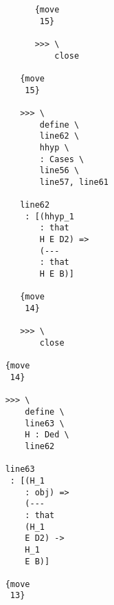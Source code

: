 \documentclass[12pt]{article}
\begin{document}
\begin{verbatim}
                                                {move 
                                                 15}

                                                >>> \
                                                    close

                                             {move 
                                              15}

                                             >>> \
                                                 define \
                                                 line62 \
                                                 hhyp \
                                                 : Cases \
                                                 line56 \
                                                 line57, line61

                                             line62 
                                              : [(hhyp_1 
                                                 : that 
                                                 H E D2) => 
                                                 (--- 
                                                 : that 
                                                 H E B)]

                                             {move 
                                              14}

                                             >>> \
                                                 close

                                          {move 
                                           14}

                                          >>> \
                                              define \
                                              line63 \
                                              H : Ded \
                                              line62

                                          line63 
                                           : [(H_1 
                                              : obj) => 
                                              (--- 
                                              : that 
                                              (H_1 
                                              E D2) -> 
                                              H_1 
                                              E B)]

                                          {move 
                                           13}


\end{verbatim}
\end{document}
